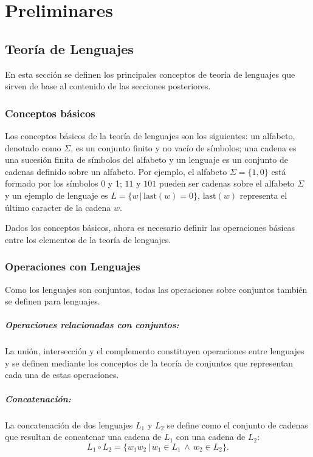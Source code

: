 

\chapter{Preliminares}
\label{chap:preliminaries}

\section{Teoría de Lenguajes}

En esta sección se definen los principales conceptos de teoría de lenguajes que sirven de base al contenido de las secciones posteriores.

\subsection{Conceptos básicos}

Los conceptos básicos de la teoría de lenguajes son los siguientes: un alfabeto, denotado como $\Sigma$, es un conjunto finito y no vacío de símbolos;
una cadena es una sucesión finita de símbolos del alfabeto y un lenguaje es un conjunto de cadenas definido sobre un alfabeto. Por ejemplo, el 
alfabeto $\Sigma=\{1,0\}$ está formado por los símbolos 0 y 1; $11$ y $101$ pueden ser cadenas sobre el alfabeto $\Sigma$ y un ejemplo de lenguaje
es $L=\{w\,|\,\text{last}(w)=0\}$, $\text{last}(w)$ representa el último caracter de la cadena $w$.

Dados los conceptos básicos, ahora es necesario definir las operaciones básicas entre los elementos de la teoría de lenguajes.

\subsection{Operaciones con Lenguajes}

Como los lenguajes son conjuntos, todas las operaciones sobre conjuntos también se definen para lenguajes.

\paragraph{Operaciones relacionadas con conjuntos:} La unión, intersección y el complemento 
constituyen operaciones entre lenguajes y se definen mediante los conceptos de la teoría de conjuntos
que representan cada una de estas operaciones.

\paragraph{Concatenación:} La concatenación de dos lenguajes $L_1$ y $L_2$ se define como el conjunto
de cadenas que resultan de concatenar una cadena de $L_1$ con una cadena de $L_2$:
$$L_1\circ L_2=\{w_1w_2\,|\,w_1\in L_1\,\wedge\,w_2\in L_2\}.$$

